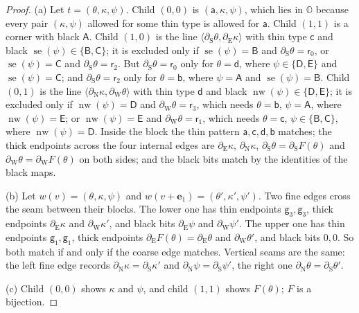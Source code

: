 \begin{proof}
(a) Let $t=(\theta,\kappa,\psi)$. Child $(0,0)$ is $(\mathsf a,\kappa,\psi)$, which lies in $\mathbb O$ because every pair $(\kappa,\psi)$ allowed for some thin type is allowed for $\mathsf a$. Child $(1,1)$ is a corner with black $\mathsf A$. Child $(1,0)$ is the line $\langle\partial_{\mathrm S}\theta,\partial_{\mathrm E}\kappa\rangle$ with thin type $\mathsf c$ and black $\operatorname{se}(\psi)\in\{\mathsf B,\mathsf C\}$; it is excluded only if $\operatorname{se}(\psi)=\mathsf B$ and $\partial_{\mathrm S}\theta=\mathsf r_0$, or $\operatorname{se}(\psi)=\mathsf C$ and $\partial_{\mathrm S}\theta=\mathsf r_2$. But $\partial_{\mathrm S}\theta=\mathsf r_0$ only for $\theta=\mathsf d$, where $\psi\in\{\mathsf D,\mathsf E\}$ and $\operatorname{se}(\psi)=\mathsf C$; and $\partial_{\mathrm S}\theta=\mathsf r_2$ only for $\theta=\mathsf b$, where $\psi=\mathsf A$ and $\operatorname{se}(\psi)=\mathsf B$. Child $(0,1)$ is the line $\langle\partial_{\mathrm N}\kappa,\partial_{\mathrm W}\theta\rangle$ with thin type $\mathsf d$ and black $\operatorname{nw}(\psi)\in\{\mathsf D,\mathsf E\}$; it is excluded only if $\operatorname{nw}(\psi)=\mathsf D$ and $\partial_{\mathrm W}\theta=\mathsf r_3$, which needs $\theta=\mathsf b$, $\psi=\mathsf A$, where $\operatorname{nw}(\psi)=\mathsf E$; or $\operatorname{nw}(\psi)=\mathsf E$ and $\partial_{\mathrm W}\theta=\mathsf r_1$, which needs $\theta=\mathsf c$, $\psi\in\{\mathsf B,\mathsf C\}$, where $\operatorname{nw}(\psi)=\mathsf D$. Inside the block the thin pattern $\mathsf a,\mathsf c,\mathsf d,\mathsf b$ matches; the thick endpoints across the four internal edges are $\partial_{\mathrm E}\kappa$, $\partial_{\mathrm N}\kappa$, $\partial_{\mathrm S}\theta=\partial_{\mathrm S}F(\theta)$ and $\partial_{\mathrm W}\theta=\partial_{\mathrm W}F(\theta)$ on both sides; and the black bits match by the identities of the black maps.

(b) Let $w(v)=(\theta,\kappa,\psi)$ and $w(v+\mathbf e_1)=(\theta',\kappa',\psi')$. Two fine edges cross the seam between their blocks. The lower one has thin endpoints $\mathsf g_3,\mathsf g_3$, thick endpoints $\partial_{\mathrm E}\kappa$ and $\partial_{\mathrm W}\kappa'$, and black bits $\partial_{\mathrm E}\psi$ and $\partial_{\mathrm W}\psi'$. The upper one has thin endpoints $\mathsf g_1,\mathsf g_1$, thick endpoints $\partial_{\mathrm E}F(\theta)=\partial_{\mathrm E}\theta$ and $\partial_{\mathrm W}\theta'$, and black bits $0,0$. So both match if and only if the coarse edge matches. Vertical seams are the same: the left fine edge records $\partial_{\mathrm N}\kappa=\partial_{\mathrm S}\kappa'$ and $\partial_{\mathrm N}\psi=\partial_{\mathrm S}\psi'$, the right one $\partial_{\mathrm N}\theta=\partial_{\mathrm S}\theta'$.

(c) Child $(0,0)$ shows $\kappa$ and $\psi$, and child $(1,1)$ shows $F(\theta)$; $F$ is a bijection.
\end{proof}

